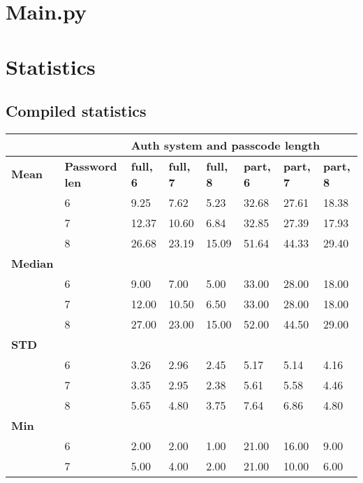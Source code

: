 \documentclass[british,11pt,a4paper]{article}
\begin{document}
\begin{appendices}
	\section{Main.py}\label{app:main}
		
	\clearpage

	\section{Statistics}\label{app:extra_stats}
	\subsection{Compiled statistics}
	\begin{table}[h]
		\centering
		\begin{tabular}{|l|l|l|l|l|l|l|l|}
		\hline
		& & \multicolumn{6}{l|}{\textbf{Auth system and passcode length}} \\ \hline
		\textbf{Mean} & \textbf{Password len} & \textbf{full, 6} & \textbf{full, 7} & \textbf{full, 8} & \textbf{part, 6} & \textbf{part, 7} & \textbf{part, 8} \\ \hline
		 & 6 & 9.25 & 7.62 & 5.23 & 32.68 & 27.61 & 18.38 \\ \hline
		 & 7 & 12.37 & 10.60 & 6.84 & 32.85 & 27.39 & 17.93 \\ \hline
		 & 8 & 26.68 & 23.19 & 15.09 & 51.64 & 44.33 & 29.40 \\ \hline
		\textbf{Median} &  &  &  &  &  &  &  \\ \hline
		 & 6 & 9.00 & 7.00 & 5.00 & 33.00 & 28.00 & 18.00 \\ \hline
		 & 7 & 12.00 & 10.50 & 6.50 & 33.00 & 28.00 & 18.00 \\ \hline
		 & 8 & 27.00 & 23.00 & 15.00 & 52.00 & 44.50 & 29.00 \\ \hline
		\textbf{STD} &  &  &  &  &  &  &  \\ \hline
		 & 6 & 3.26 & 2.96 & 2.45 & 5.17 & 5.14 & 4.16 \\ \hline
		 & 7 & 3.35 & 2.95 & 2.38 & 5.61 & 5.58 & 4.46 \\ \hline
		 & 8 & 5.65 & 4.80 & 3.75 & 7.64 & 6.86 & 4.80 \\ \hline
		\textbf{Min} &  &  &  &  &  &  &  \\ \hline
		 & 6 & 2.00 & 2.00 & 1.00 & 21.00 & 16.00 & 9.00 \\ \hline
		 & 7 & 5.00 & 4.00 & 2.00 & 21.00 & 10.00 & 6.00 \\ \hline

\end{tabular}
\end{table}
\end{appendices}
\end{document}
